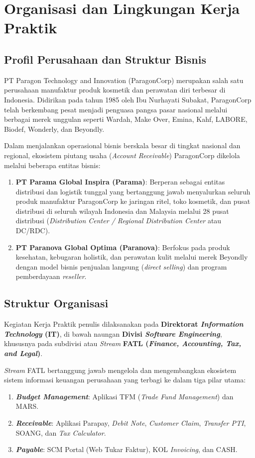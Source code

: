 \chapter{Organisasi dan Lingkungan Kerja Praktik}

\section{Profil Perusahaan dan Struktur Bisnis}
PT Paragon Technology and Innovation (ParagonCorp) merupakan salah satu perusahaan manufaktur produk kosmetik dan perawatan diri terbesar di Indonesia. Didirikan pada tahun 1985 oleh Ibu Nurhayati Subakat, ParagonCorp telah berkembang pesat menjadi penguasa pangsa pasar nasional melalui berbagai merek unggulan seperti Wardah, Make Over, Emina, Kahf, LABORE, Biodef, Wonderly, dan Beyondly.

Dalam menjalankan operasional bisnis berskala besar di tingkat nasional dan regional, ekosistem piutang usaha (\textit{Account Receivable}) ParagonCorp dikelola melalui beberapa entitas bisnis:
\begin{enumerate}[label=\arabic*)]
  \item \textbf{PT Parama Global Inspira (Parama)}: Berperan sebagai entitas distribusi dan logistik tunggal yang bertanggung jawab menyalurkan seluruh produk manufaktur ParagonCorp ke jaringan ritel, toko kosmetik, dan pusat distribusi di seluruh wilayah Indonesia dan Malaysia melalui 28 pusat distribusi (\textit{Distribution Center / Regional Distribution Center} atau DC/RDC).
  \item \textbf{PT Paranova Global Optima (Paranova)}: Berfokus pada produk kesehatan, kebugaran holistik, dan perawatan kulit melalui merek Beyondly dengan model bisnis penjualan langsung (\textit{direct selling}) dan program pemberdayaan \textit{reseller}.
\end{enumerate}

\section{Struktur Organisasi}
Kegiatan Kerja Praktik penulis dilaksanakan pada \textbf{Direktorat \textit{Information Technology} (IT)}, di bawah naungan \textbf{Divisi \textit{Software Engineering}}, khususnya pada subdivisi atau \textit{Stream} \textbf{FATL (\textit{Finance, Accounting, Tax, and Legal})}.

\textit{Stream} FATL bertanggung jawab mengelola dan mengembangkan ekosistem sistem informasi keuangan perusahaan yang terbagi ke dalam tiga pilar utama:
\begin{enumerate}[label=\alph*)]
  \item \textbf{\textit{Budget Management}}: Aplikasi TFM (\textit{Trade Fund Management}) dan MARS.
  \item \textbf{\textit{Receivable}}: Aplikasi Parapay, \textit{Debit Note}, \textit{Customer Claim}, \textit{Transfer PTI}, SOANG, dan \textit{Tax Calculator}.
  \item \textbf{\textit{Payable}}: SCM Portal (Web Tukar Faktur), KOL \textit{Invoicing}, dan CASH.
\end{enumerate}

